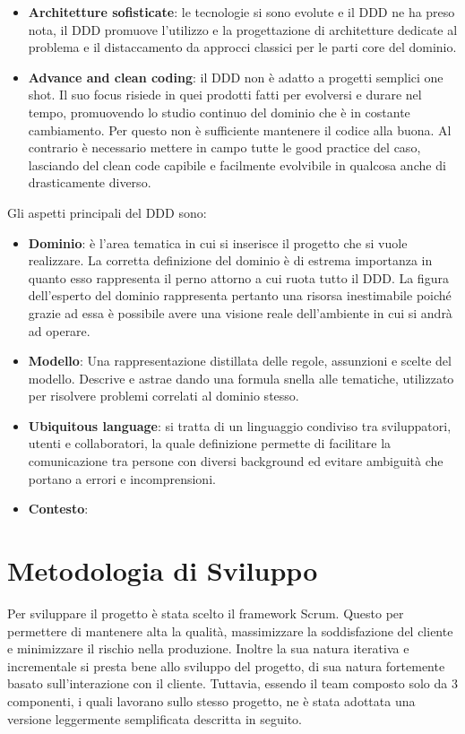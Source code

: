 \begin{itemize}
        \item \textbf{Architetture sofisticate}: le tecnologie si sono evolute e il DDD ne ha preso nota, il DDD promuove l'utilizzo e la progettazione di architetture dedicate al problema e il distaccamento da approcci classici per le parti core del dominio.
        
        \item \textbf{Advance and clean coding}: il DDD non è adatto a progetti semplici one shot. Il suo focus risiede in quei prodotti fatti per evolversi e durare nel tempo, promuovendo lo studio continuo del dominio che è in costante cambiamento. Per questo non è sufficiente mantenere il codice alla buona. Al contrario è necessario mettere in campo tutte le good practice del caso, lasciando del clean code capibile e facilmente evolvibile in qualcosa anche di drasticamente diverso. 
        
        
    \end{itemize}
    
    
    
    Gli aspetti principali del DDD sono:
    \begin{itemize}
        \item \textbf{Dominio}: è l'area tematica in cui si inserisce il progetto che si vuole realizzare. La corretta definizione del dominio è di estrema importanza in quanto esso rappresenta il perno attorno a cui ruota tutto il DDD. La figura dell'esperto del dominio rappresenta pertanto una risorsa inestimabile poiché grazie ad essa è possibile avere una visione reale dell'ambiente in cui si andrà ad operare. 
        \item \textbf{Modello}: Una rappresentazione distillata delle regole, assunzioni e scelte del modello. Descrive e astrae dando una formula snella alle tematiche, utilizzato per risolvere problemi correlati al dominio stesso.
        \item \textbf{Ubiquitous language}: si tratta di un linguaggio condiviso tra sviluppatori, utenti e collaboratori, la quale definizione permette di facilitare la comunicazione tra persone con diversi background ed evitare ambiguità che portano a errori e incomprensioni.
        \item \textbf{Contesto}: %
    \end{itemize}

\section{Metodologia di Sviluppo}
Per sviluppare il progetto è stata scelto il framework Scrum. Questo per permettere di mantenere alta la qualità, massimizzare la soddisfazione del cliente e minimizzare il rischio nella produzione. Inoltre la sua natura iterativa e incrementale si presta bene allo sviluppo del progetto, di sua natura fortemente basato sull'interazione con il cliente. Tuttavia, essendo il team composto solo da 3 componenti, i quali lavorano sullo stesso progetto, ne è stata adottata una versione leggermente semplificata descritta in seguito. 
